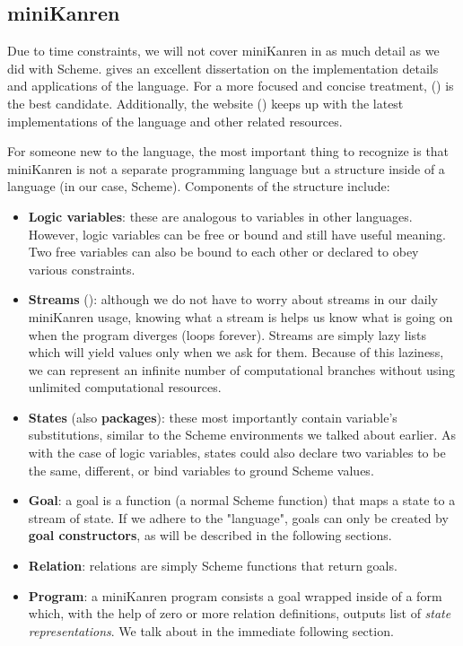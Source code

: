 \subsection{miniKanren}
Due to time constraints, we will not cover miniKanren in as much detail as we did with Scheme.
\textcite{byrdphd} gives an excellent dissertation on the implementation details and applications of the language.
For a more focused and concise treatment, (\cite{micro}) is the best candidate.
Additionally, the website (\cite{mkdotorg}) keeps up with the latest implementations of the language and other related resources.

For someone new to the language, the most important thing to recognize is that miniKanren is not a separate programming language but a structure inside of a language (in our case, Scheme). Components of the structure include:
\begin{itemize}
\item \textbf{Logic variables}: these are analogous to variables in other languages. However, logic variables can be free or bound and still have useful meaning. Two free variables can also be bound to each other or declared to obey various constraints.
\item \textbf{Streams} (\cite{sicp}): although we do not have to worry about streams in our daily miniKanren usage, knowing what a stream is helps us know what is going on when the program diverges (loops forever). Streams are simply lazy lists which will yield values only when we ask for them. Because of this laziness, we can represent an infinite number of computational branches without using unlimited computational resources.
\item \textbf{States} (also \textbf{packages}): these most importantly contain variable's substitutions, similar to the Scheme environments we talked about earlier. As with the case of logic variables, states could also declare two variables to be the same, different, or bind variables to ground Scheme values.
\item \textbf{Goal}: a goal is a function (a normal Scheme function) that maps a state to a stream of state. If we adhere to the "language", goals can only be created by \textbf{goal constructors}, as will be described in the following sections.
\item \textbf{Relation}: relations are simply Scheme functions that return goals.
\item \textbf{Program}: a miniKanren program consists a goal wrapped inside of a  form which, with the help of zero or more relation definitions, outputs list of \textit{state representations}. We talk about  in the immediate following section.
\end{itemize}

